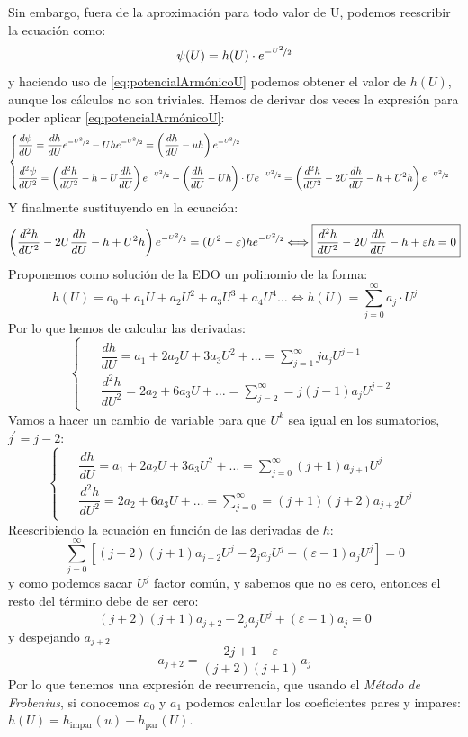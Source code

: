 \documentclass{report}
\begin{document}
    \noindent Sin embargo, fuera de la aproximación para todo valor de U, podemos
    reescribir la ecuación como:
    \[\psi(U)=h(U)\cdot e^{-\nicefrac{U^2}{2}}\]
    y haciendo uso de \ref{eq:potencialArmónicoU} podemos obtener el valor
    de $h(U)$, aunque los cálculos no son triviales. Hemos de derivar dos veces
    la expresión para poder aplicar \ref{eq:potencialArmónicoU}:
    \[
      \begin{cases}
        \begin{aligned}
          &\dfrac{d\psi}{dU}=\dfrac{dh}{dU}e^{-\nicefrac{U^2}{2}}-Uhe^{-\nicefrac{U^2}{2}}=
          \left(\dfrac{dh}{dU}-uh\right)e^{-\nicefrac{U^2}{2}}\\[5pt]
          &\dfrac{d^2\psi}{dU^2}=\left(\dfrac{d^2h}{dU^2}-h-U\dfrac{dh}{dU}\right)e^{-\nicefrac{U^2}{2}}
          -\left(\dfrac{dh}{dU}-Uh\right)\cdot Ue^{-\nicefrac{U^2}{2}}=
          \left(\dfrac{d^2h}{dU^2}-2U\dfrac{dh}{dU}-h+U^2h\right)e^{-\nicefrac{U^2}{2}}
        \end{aligned}  
      \end{cases}
    \]
    Y finalmente sustituyendo en la ecuación:
    \[\left(\dfrac{d^2h}{dU^2}-2U\dfrac{dh}{dU}-h+U^2h\right)e^{-\nicefrac{U^2}{2}}
    =(U^2-\varepsilon)he^{-\nicefrac{U^2}{2}}\Longleftrightarrow\boxed{\dfrac{d^2h}{dU^2}
    -2U\dfrac{dh}{dU}-h+\varepsilon h=0}\]
    Proponemos como solución de la EDO un polinomio de la forma:
    \[h(U)=a_0+a_1U+a_2U^2+a_3U^3+a_4U^4\dots\Longleftrightarrow
    h(U)=\sum_{j=0}^{\infty}a_j\cdot U^j\]
    Por lo que hemos de calcular las derivadas:
    \[
      \begin{cases}
        \begin{aligned}
          &\dfrac{dh}{dU}    =a_1+2a_2U+3a_3U^2+\dots=\sum_{j=1}^\infty ja_jU^{j-1}\\[3pt]
          &\dfrac{d^2h}{dU^2}=2a_2+6a_3U+\dots=\sum_{j=2}^\infty= j(j-1)a_jU^{j-2}
        \end{aligned}
      \end{cases}
    \]
    Vamos a hacer un cambio de variable para que $U^k$ sea igual en los sumatorios,
    $j^\prime=j-2$:
    \[
      \begin{cases}
        \begin{aligned}
          &\dfrac{dh}{dU}    =a_1+2a_2U+3a_3U^2+\dots=\sum_{j=0}^\infty (j+1)a_{j+1}U^j\\[3pt]
          &\dfrac{d^2h}{dU^2}=2a_2+6a_3U+\dots=\sum_{j=0}^\infty= (j+1)(j+2)a_{j+2}U^j
        \end{aligned}
      \end{cases}
    \]
    Reescribiendo la ecuación en función de las derivadas de $h$:
    \[\sum_{j=0}^{\infty}\left[(j+2)(j+1)a_{j+2}U^j-2_ja_jU^j+(\varepsilon-1)a_jU^j\right]=0\]
    y como podemos sacar $U^j$ factor común, y sabemos que no es cero, entonces
    el resto del término debe de ser cero:
    \[(j+2)(j+1)a_{j+2}-2_ja_jU^j+(\varepsilon-1)a_j=0\]
    y despejando $a_{j+2}$
    \[\boxed{a_{j+2}=\dfrac{2j+1-\varepsilon}{(j+2)(j+1)}a_j}\]
    Por lo que tenemos una expresión de recurrencia, que usando el \textit{Método de Frobenius},
    si conocemos $a_0$ y $a_1$ podemos calcular los coeficientes pares y impares:
    $h(U)=h_{\text{impar}}(u)+h_{\text{par}}(U)$.\\
\end{document}
